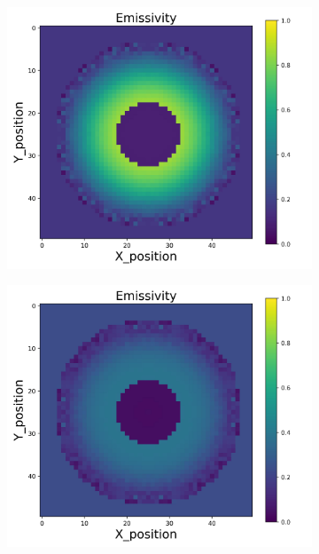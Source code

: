 {\begin{figure}[p]
\begin{minipage}{\textwidth}
\begin{subfigure}{0.325\textwidth}
        \end{subfigure}
        \begin{subfigure}{0.325\textwidth}
            \centering
            \includegraphics[width=\textwidth]{figures/raw_data/23/exp/emi_cal.jpg}
        \end{subfigure}
        \begin{subfigure}{0.325\textwidth}
            \centering
            \includegraphics[width=\textwidth]{figures/raw_data/24/exp/emi_cal.jpg}

\end{subfigure}
\end{minipage}
\end{figure}}
